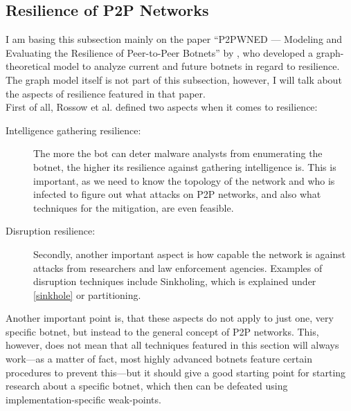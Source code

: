 \documentclass[10pt, a4paper, twocolumn]{article} %
\begin{document}
\subsection{Resilience of P2P Networks}\label{resiliency} %
I am basing this subsection mainly on the paper ``P2PWNED — Modeling and Evaluating the Resilience of Peer-to-Peer Botnets'' by \citet{p2pwned}, who developed a graph-theoretical model to analyze current and future botnets in regard to resilience. The graph model itself is not part of this subsection, however, I will talk about the aspects of resilience featured in that paper.\\
First of all, Rossow et al. defined two aspects when it comes to resilience: 
\begin{description}
\item[Intelligence gathering resilience:] The more the bot can deter malware analysts from enumerating the botnet, the higher its resilience against gathering intelligence is. This is important, as we need to know the topology of the network and who is infected to figure out what attacks on P2P networks, and also what techniques for the mitigation, are even feasible. 

\item[Disruption resilience:] Secondly, another important aspect is how capable the network is against attacks from researchers and law enforcement agencies. Examples of disruption techniques include Sinkholing, which is explained under \autoref{sinkhole} or partitioning.
\end{description}
Another important point is, that these aspects do not apply to just one, very specific botnet, but instead to the general concept of P2P networks. This, however, does not mean that all techniques featured in this section will always work---as a matter of fact, most highly advanced botnets feature certain procedures to prevent this---but it should give a good starting point for starting research about a specific botnet, which then can be defeated using implementation-specific weak-points.
\end{document}
